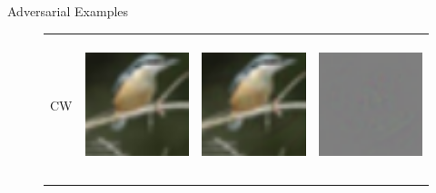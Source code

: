 \documentclass[final]{beamer}
\newlength{\onecolwid}
\newlength{\twocolwid}
\begin{document}
\begin{frame}[t]
\begin{columns}[t]
\begin{column}{\twocolwid}
\begin{columns}[t,totalwidth=\twocolwid]
\begin{column}{\onecolwid}
					\begin{block}{Adversarial Examples}
						\begin{figure}[h]
							\centering
							\begin{tabular}{rlll} 
								CW & \includegraphics[height=4cm, align=c]{../figures/carlini_wagner_orig.pdf} & \includegraphics[height=4cm, align=c]{../figures/carlini_wagner_adversarial.pdf} & \includegraphics[height=4cm, align=c]{../figures/carlini_wagner_diff.pdf}\\
								\\

\end{tabular}
\end{figure}
\end{block}
\end{column}
\end{columns}
\end{column}
\end{columns}
\end{frame}
\end{document}
